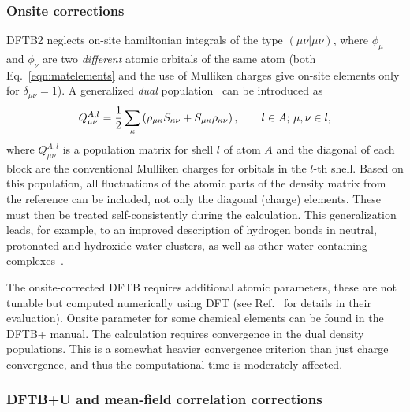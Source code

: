 \documentclass[reprint,onecolumn,superscriptaddress]{revtex4-1}
\newcommand{\dftbp}{DFTB+}
\begin{document}
\subsubsection{Onsite corrections}
\label{sec:onsite-correction}

DFTB2 neglects on-site hamiltonian integrals of the type $(\mu\nu|\mu\nu)$,
where $\phi_\mu$ and $\phi_\nu$ are two {\em different} atomic orbitals of the
same atom (both Eq.~\eqref{eqn:matelements} and the use of Mulliken charges give
on-site elements only for $\delta_{\mu\nu} = 1$). A generalized \textit{dual}
population~\cite{PhysRevB.73.045110} can be introduced as
\begin{equation}
  Q_{\mu\nu}^{A,l} = \frac{1}{2} \sum_\kappa \left(
    \rho_{\mu\kappa}S_{\kappa\nu} + S_{\mu\kappa} \rho_{\kappa\nu} \right),
  \qquad
  l\in A;\,\mu,\nu\in l
  \text,
  \label{eqn:dualpop}
\end{equation}
where $Q_{\mu\nu}^{A,l}$ is a population matrix for shell $l$ of atom $A$
and the diagonal of each block are the conventional Mulliken charges for
orbitals in the $l$-th shell. Based on this population, all fluctuations of the
atomic parts of the density matrix from the reference can be included, not only
the diagonal (charge) elements.  These must then be treated self-consistently
during the calculation. This generalization leads, for example, to an improved
description of hydrogen bonds in neutral, protonated and hydroxide water
clusters, as well as other water-containing complexes~\cite{Dominguez2015}.

The onsite-corrected DFTB requires additional atomic parameters, these are not
tunable but computed numerically using DFT (see Ref.~\cite{Dominguez2013}
for details in their evaluation). Onsite parameter for some chemical elements
can be found in the \dftbp{} manual. The calculation requires convergence in the
dual density populations. This is a somewhat heavier convergence criterion than
just charge convergence, and thus the computational time is moderately
affected.


\subsubsection{DFTB+U and mean-field correlation corrections}
\end{document}
